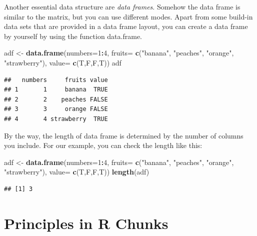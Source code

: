 \documentclass[]{report}
\newenvironment{Shaded}{\begin{snugshade}}{\end{snugshade}}
\newcommand{\KeywordTok}[1]{\textcolor[rgb]{0.13,0.29,0.53}{\textbf{#1}}}
\newcommand{\DataTypeTok}[1]{\textcolor[rgb]{0.13,0.29,0.53}{#1}}
\newcommand{\DecValTok}[1]{\textcolor[rgb]{0.00,0.00,0.81}{#1}}
\newcommand{\StringTok}[1]{\textcolor[rgb]{0.31,0.60,0.02}{#1}}
\newcommand{\OperatorTok}[1]{\textcolor[rgb]{0.81,0.36,0.00}{\textbf{#1}}}
\newcommand{\NormalTok}[1]{#1}
\begin{document}
Another essential data structure are \emph{data frames}. Somehow the
data frame is similar to the matrix, but you can use different modes.
Apart from some build-in data sets that are provided in a data frame
layout, you can create a data frame by yourself by using the function
data.frame.

\begin{Shaded}
\begin{Highlighting}[]
\NormalTok{adf <-}\StringTok{ }\KeywordTok{data.frame}\NormalTok{(}\DataTypeTok{numbers=}\DecValTok{1}\OperatorTok{:}\DecValTok{4}\NormalTok{,}
                  \DataTypeTok{fruits=} \KeywordTok{c}\NormalTok{(}\StringTok{"banana"}\NormalTok{, }\StringTok{"peaches"}\NormalTok{, }\StringTok{"orange"}\NormalTok{, }\StringTok{"strawberry"}\NormalTok{),}
                  \DataTypeTok{value=} \KeywordTok{c}\NormalTok{(T,F,F,T))}
\NormalTok{adf}
\end{Highlighting}
\end{Shaded}

\begin{verbatim}
##   numbers     fruits value
## 1       1     banana  TRUE
## 2       2    peaches FALSE
## 3       3     orange FALSE
## 4       4 strawberry  TRUE
\end{verbatim}

By the way, the length of data frame is determined by the number of
columns you include. For our example, you can check the length like
this:

\begin{Shaded}
\begin{Highlighting}[]
\NormalTok{adf <-}\StringTok{ }\KeywordTok{data.frame}\NormalTok{(}\DataTypeTok{numbers=}\DecValTok{1}\OperatorTok{:}\DecValTok{4}\NormalTok{,}
                  \DataTypeTok{fruits=} \KeywordTok{c}\NormalTok{(}\StringTok{"banana"}\NormalTok{, }\StringTok{"peaches"}\NormalTok{, }\StringTok{"orange"}\NormalTok{, }\StringTok{"strawberry"}\NormalTok{),}
                  \DataTypeTok{value=} \KeywordTok{c}\NormalTok{(T,F,F,T))}
\KeywordTok{length}\NormalTok{(adf)}
\end{Highlighting}
\end{Shaded}

\begin{verbatim}
## [1] 3
\end{verbatim}

\section{Principles in R Chunks}\label{principles-in-r-chunks}
\end{document}
